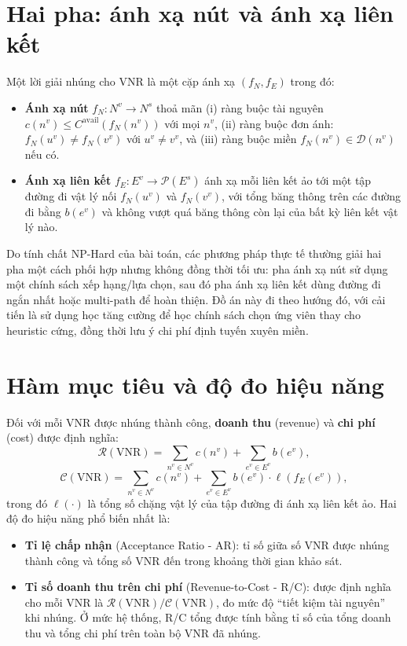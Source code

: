\documentclass[../DoAn.tex]{subfiles}
\begin{document}
\section{Hai pha: ánh xạ nút và ánh xạ liên kết}
\label{sec:two-phase}

Một lời giải nhúng cho VNR là một cặp ánh xạ $(f_N, f_E)$ trong đó:
\begin{itemize}
\item \textbf{Ánh xạ nút} $f_N : N^v \to N^s$ thoả mãn (i) ràng buộc tài nguyên $c(n^v) \leq C^{\text{avail}}(f_N(n^v))$ với mọi $n^v$, (ii) ràng buộc đơn ánh: $f_N(u^v) \neq f_N(v^v)$ với $u^v \neq v^v$, và (iii) ràng buộc miền $f_N(n^v) \in \mathcal{D}(n^v)$ nếu có.
\item \textbf{Ánh xạ liên kết} $f_E : E^v \to \mathcal{P}(E^s)$ ánh xạ mỗi liên kết ảo tới một tập đường đi vật lý nối $f_N(u^v)$ và $f_N(v^v)$, với tổng băng thông trên các đường đi bằng $b(e^v)$ và không vượt quá băng thông còn lại của bất kỳ liên kết vật lý nào.
\end{itemize}

Do tính chất NP-Hard của bài toán, các phương pháp thực tế thường giải hai pha một cách phối hợp nhưng không đồng thời tối ưu: pha ánh xạ nút sử dụng một chính sách xếp hạng/lựa chọn, sau đó pha ánh xạ liên kết dùng đường đi ngắn nhất hoặc multi-path để hoàn thiện. Đồ án này đi theo hướng đó, với cải tiến là sử dụng học tăng cường để học chính sách chọn ứng viên thay cho heuristic cứng, đồng thời lưu ý chi phí định tuyến xuyên miền.

\section{Hàm mục tiêu và độ đo hiệu năng}
\label{sec:objective}

Đối với mỗi VNR được nhúng thành công, \textbf{doanh thu} (revenue) và \textbf{chi phí} (cost) được định nghĩa:
\begin{equation}
    \mathcal{R}(\text{VNR}) = \sum_{n^v \in N^v} c(n^v) + \sum_{e^v \in E^v} b(e^v),
    \label{eq:revenue}
\end{equation}
\begin{equation}
    \mathcal{C}(\text{VNR}) = \sum_{n^v \in N^v} c(n^v) + \sum_{e^v \in E^v} b(e^v) \cdot \ell(f_E(e^v)),
    \label{eq:cost}
\end{equation}
trong đó $\ell(\cdot)$ là tổng số chặng vật lý của tập đường đi ánh xạ liên kết ảo. Hai độ đo hiệu năng phổ biến nhất là:
\begin{itemize}
\item \textbf{Tỉ lệ chấp nhận} (Acceptance Ratio - AR): tỉ số giữa số VNR được nhúng thành công và tổng số VNR đến trong khoảng thời gian khảo sát.
\item \textbf{Tỉ số doanh thu trên chi phí} (Revenue-to-Cost - R/C): được định nghĩa cho mỗi VNR là $\mathcal{R}(\text{VNR}) / \mathcal{C}(\text{VNR})$, đo mức độ ``tiết kiệm tài nguyên'' khi nhúng. Ở mức hệ thống, R/C tổng được tính bằng tỉ số của tổng doanh thu và tổng chi phí trên toàn bộ VNR đã nhúng.
\end{itemize}
\end{document}
